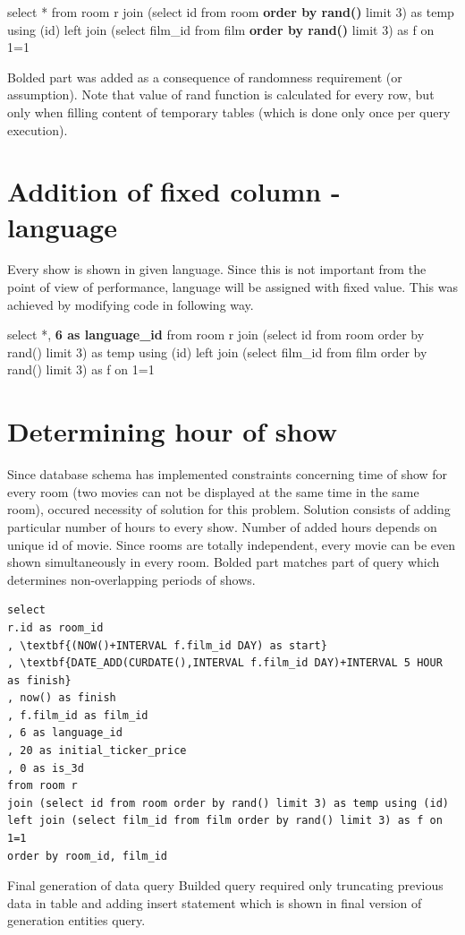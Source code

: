 \documentclass[10pt,a4paper]{article}
\begin{document}
select * from room r
join (select id from room \textbf{order by rand()} limit 3) as temp using (id)
left join (select film\_id from film \textbf{order by rand()} limit 3) as f on 1=1

Bolded part was added as a consequence of randomness requirement (or assumption). Note that value of rand function is calculated for every row, but only when filling content of temporary tables (which is done only once per query execution). 
\section{Addition of fixed column - language}
Every show is shown in given language. Since this is not important from the point of view of performance, language will be assigned with fixed value. This was achieved by modifying code in following way. 

select *, \textbf{6 as language\_id} from room r
join (select id from room order by rand() limit 3) as temp using (id)
left join (select film\_id from film order by rand() limit 3) as f on 1=1

\section{Determining hour of show}
Since database schema has implemented constraints concerning time of show for every room (two movies can not be displayed at the same time in the same room), occured necessity of solution for this problem. 
Solution consists of adding particular number of hours to every show. Number of added hours depends on unique id of movie. Since rooms are totally independent, every movie can be even shown simultaneously in every room. 
Bolded part matches part of query which determines non-overlapping periods of shows.

\lstset{language=SQL}
\begin{lstlisting}[frame=single]
select
r.id as room_id
, \textbf{(NOW()+INTERVAL f.film_id DAY) as start}
, \textbf{DATE_ADD(CURDATE(),INTERVAL f.film_id DAY)+INTERVAL 5 HOUR as finish}
, now() as finish
, f.film_id as film_id
, 6 as language_id
, 20 as initial_ticker_price
, 0 as is_3d
from room r
join (select id from room order by rand() limit 3) as temp using (id)
left join (select film_id from film order by rand() limit 3) as f on 1=1
order by room_id, film_id 
\end{lstlisting}

Final generation of data query
Builded query required only truncating previous data in table and adding insert statement which is shown in final version of generation entities query. 
\end{document}
